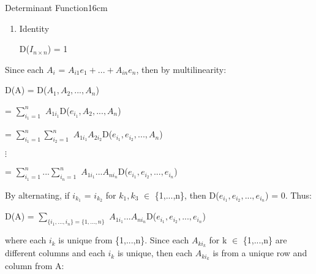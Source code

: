 \begin{definition}{Determinant Function}{16cm}
\begin{enumerate}[label=(\alph*), leftmargin=1cm, itemsep=0.1cm]
                \hspace{0.5cm}
                D(A) = D(B) = -D(A)
                \hspace{0.5cm}
                $\Rightarrow$
                \hspace{0.5cm}
                D(A) = 0

            \item {\color{lgreen} Identity}
            
                \hspace{0.5cm}
                D($I_{n \times n}$) = 1
        \end{enumerate}

        Since each $A_i$ = $A_{i1}e_1 + ... + A_{in}e_n$, then
        by multilinearity:

        \hspace{0.5cm}
        D(A)
        = D($A_1,A_2,...,A_n$)

        \hspace{1.6cm}
        = $\sum_{i_1=1}^n$
            $A_{1{i_1}}$D($e_{i_1},A_2,...,A_n$)

        \hspace{1.6cm}
        = $\sum_{i_1=1}^n \sum_{i_2=1}^n$
            $A_{1{i_1}}A_{2{i_2}}$D($e_{i_1},e_{i_2},...,A_n$)

        \hspace{1.6cm}
        $\vdots$

        \hspace{1.6cm}
        = $\sum_{i_1=1}^n ... \sum_{i_n=1}^n$
            $A_{1{i_1}}...A_{n{i_n}}$D($e_{i_1},e_{i_2},...,e_{i_n}$)

        By alternating, if $i_{k_1}$ = $i_{k_2}$ for $k_1,k_3$ $\in$ \{1,...,n\},
        then D($e_{i_1},e_{i_2},...,e_{i_n}$) = 0. Thus:

        \hspace{0.5cm}
        D(A) = $\sum_{\{i_1,...,i_n\} = \{1,...,n\}}$
                $A_{1{i_1}}...A_{n{i_n}}$D($e_{i_1},e_{i_2},...,e_{i_n}$)

        where each $i_k$ is unique from \{1,...,n\}.
        Since each $A_{k{i_k}}$ for k $\in$ \{1,...,n\} are different columns
        and each $i_k$ is unique, then each $A_{k{i_k}}$ is from a unique
        row and column from A:


\end{definition}
